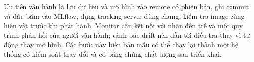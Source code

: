Ưu tiên vận hành là lưu dữ liệu và mô hình vào remote có phiên bản, ghi commit và dấu băm vào MLflow, dựng tracking server dùng chung, kiểm tra image cùng hiện vật trước khi phát hành. Monitor cần kết nối với nhãn đến trễ và một quy trình phản hồi của người vận hành; cảnh báo drift nên dẫn tới điều tra thay vì tự động thay mô hình. Các bước này biến bản mẫu có thể chạy lại thành một hệ thống có kiểm soát thay đổi và có bằng chứng chất lượng sau triển khai.

